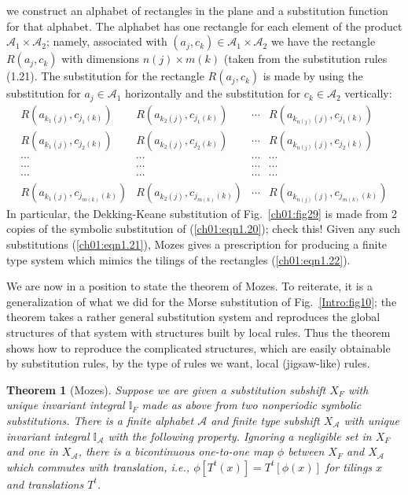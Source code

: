 \documentclass[reqno]{stml-l}
\theoremstyle{plain}
\newtheorem{theorem}{Theorem}[chapter]
\theoremstyle{definition}
\numberwithin{equation}{chapter}
\begin{document}
\noindent we construct an alphabet of rectangles in the plane and a substitution function for that alphabet. The alphabet has one rectangle for each element of the product $\mathcal{A}_{1}\times \mathcal{A}_{2}$; namely, associated with $(a_{j}, c_{k})\in \mathcal{A}_{1}\times \mathcal{A}_{2}$ we have the rectangle $R(a_{j}, c_{k})$ with dimensions $n(j)\times m(k)$ (taken from the substitution rules (1.21). The substitution for the rectangle $R(a_{j}, c_{k})$ is made by using the substitution for $a_{j}\in \mathcal{A}_{1}$ horizontally and the substitution for $c_{k}\in \mathcal{A}_{2}$ vertically:
\begin{equation}\label{ch01:eqn1.22}
\begin{matrix}R(a_{k_{1}(j)},c_{j_{1}(k)})  & R(a_{k_{2}(j)}, c_{j_{1}(k)})
& \cdots & R(a_{k_{n(j)}(j)}, c_{j_{1}(k)})\\
R(a_{k_{1}(j)},c_{j_{2}(k)}) & R(a_{k_{2}(j)},c_{j_{2}(k)}) & \cdots & R(a_{k_{n(j)}(j)}, c_{j_{2}(k)})\\
\cdots & \cdots & \cdots & \cdots \\
\cdots & \cdots & \cdots & \cdots \\
\cdots & \cdots & \cdots & \cdots \\
R(a_{k_{1}(j)}, c_{j_{m(k)}(k)}) & R(a_{k_{2}(j)}, c_{j_{m(k)}(k)}) & \cdots
& R(a_{k_{n(j)}(j)}, c_{j_{m(k)}(k)})
\end{matrix}
\end{equation}
In particular, the Dekking-Keane substitution of Fig.~\ref{ch01:fig29} is made from 2 copies of the symbolic substitution of (\ref{ch01:eqn1.20}); check this! Given any such substitutions (\ref{ch01:eqn1.21}), Mozes gives a prescription for producing a finite type system which mimics the tilings of the rectangles (\ref{ch01:eqn1.22}).

We are now in a position to state the theorem of
Mozes. To reiterate, it is a
generalization of what we did for the Morse substitution of
Fig.~\ref{Intro:fig10}; the theorem takes a rather general
substitution system and reproduces the global structures of that
system with structures built by local rules. Thus the theorem shows
how to reproduce the complicated structures, which are easily
obtainable by substitution rules, by the type of rules we want,
local (jigsaw-like) rules.

\begin{theorem}[Mozes]\label{ch01:thm1.10}
Suppose we are given a substitution subshift $X_{F}$ with unique invariant integral $\mathbb{I}_{F}$ made as above from two nonperiodic symbolic substitutions. There is a finite alphabet $\mathcal{A}$ and finite type subshift $X_{\mathcal{A}}$ with unique invariant integral $\mathbb{I}_{\mathcal{A}}$ with the following property. Ignoring a negligible set in $X_{F}$ and one in $X_{\mathcal{A}}$, there is a bicontinuous one-to-one map $\phi$ between $X_{F}$ and $X_{\mathcal{A}}$ which commutes with translation, i.e., $\phi[T^{t}(x)]=T^{t}[\phi(x)]$ for tilings $x$ and translations $T^{t}$.
\end{theorem}
\end{document}
